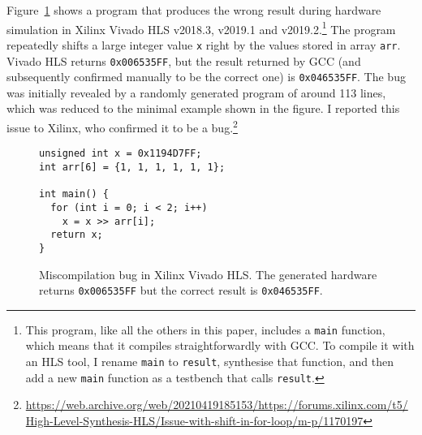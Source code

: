 \begin{example}
\label{ex:vivado_miscomp}
Figure~\ref{fig:vivado_bug1} shows a program that produces the wrong result
during hardware simulation in Xilinx Vivado HLS v2018.3, v2019.1 and
v2019.2.\footnote{This program, like all the others in this paper, includes a
  \texttt{main} function, which means that it compiles straightforwardly with
  GCC. To compile it with an HLS tool, I rename \texttt{main} to
  \texttt{result}, synthesise that function, and then add a new \texttt{main}
  function as a testbench that calls \texttt{result}.} The program repeatedly
shifts a large integer value \texttt{x} right by the values stored in array
\texttt{arr}.  Vivado HLS returns \texttt{0x006535FF}, but the result returned
by GCC (and subsequently confirmed manually to be the correct one) is
\texttt{0x046535FF}. The bug was initially revealed by a randomly generated
program of around 113 lines, which was reduced to the minimal example shown in
the figure.  I reported this issue to Xilinx, who confirmed it to be a
bug.\footnote{\url{https://web.archive.org/web/20210419185153/https://forums.xilinx.com/t5/High-Level-Synthesis-HLS/Issue-with-shift-in-for-loop/m-p/1170197}}
\end{example}

\begin{figure}
\centering
\begin{minipage}{6cm}
\begin{verbatim}
unsigned int x = 0x1194D7FF;
int arr[6] = {1, 1, 1, 1, 1, 1};

int main() {
  for (int i = 0; i < 2; i++)
    x = x >> arr[i];
  return x;
}
\end{verbatim}
\end{minipage}
\caption[Miscompilation bug in Xilinx Vivado HLS v2018.3, v2019.1 and
v2019.2.]{Miscompilation bug in Xilinx Vivado HLS. The generated hardware
  returns \texttt{0x006535FF} but the correct result is \texttt{0x046535FF}.}%
\label{fig:vivado_bug1}
\end{figure}

\def\totaltestcases{6700}
\def\totaltestcasefailures{1191}
\def\numuniquebugs{8}
\def\vivadotestcases{3645}

